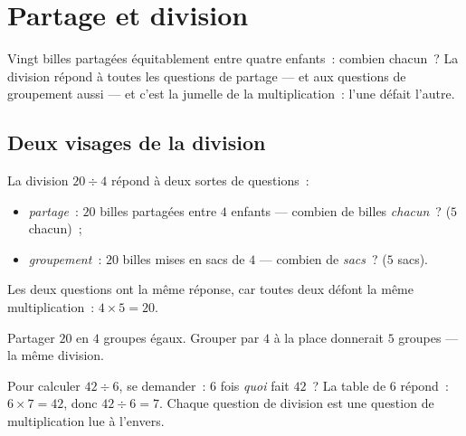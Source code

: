 \chapter{Partage et division}\label{ch:g3:division}

Vingt billes partagées équitablement entre quatre enfants~:
combien chacun~? La division répond à toutes les questions de
partage --- et aux questions de groupement aussi --- et c'est la
jumelle de la multiplication~: l'une défait l'autre.

\section{Deux visages de la division}

\begin{definition}[Division]\label{def:g3:division:def}
La division $20 \div 4$ répond à deux sortes de questions~:
\begin{itemize}
  \item \emph{partage}~: $20$ billes partagées entre $4$ enfants ---
        combien de billes \emph{chacun}~? ($5$ chacun)~;
  \item \emph{groupement}~: $20$ billes mises en sacs de $4$ ---
        combien de \emph{sacs}~? ($5$ sacs).
\end{itemize}
Les deux questions ont la même réponse, car toutes deux défont
la même multiplication~: $4 \times 5 = 20$.
\end{definition}

\begin{omfigure}

{\small Partager $20$ en $4$ groupes égaux. Grouper par $4$ à la
place donnerait $5$ groupes --- la même division.}
\end{omfigure}

\begin{method}\label{met:g3:division:tables}
Pour calculer $42 \div 6$, se demander~: \guillemotleft{} $6$ fois
\emph{quoi} fait $42$~? \guillemotright{} La table de $6$ répond~:
$6 \times 7 = 42$, donc $42 \div 6 = 7$. Chaque question de division
est une question de multiplication lue à l'envers.
\end{method}

